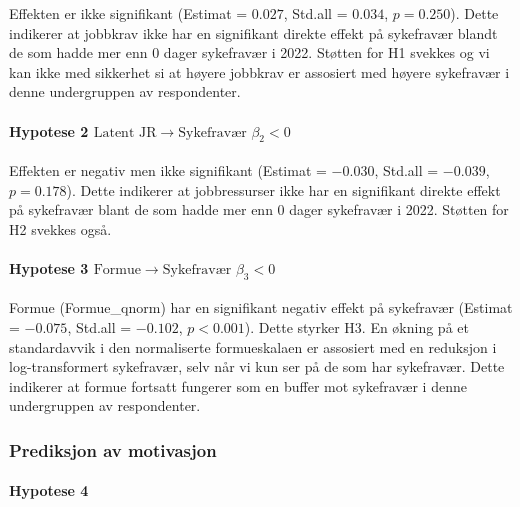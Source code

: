 \documentclass[
  12pt,
  a4paper,
  DIV=11,
  numbers=noendperiod]{scrartcl}
\let\oldparagraph\paragraph
\renewcommand{\paragraph}[1]{\oldparagraph{#1}\mbox{}}
\begin{document}
Effekten er ikke signifikant (Estimat = \(0.027\), Std.all = \(0.034\),
\(p = 0.250\)). Dette indikerer at jobbkrav ikke har en signifikant
direkte effekt på sykefravær blandt de som hadde mer enn 0 dager
sykefravær i 2022. Støtten for H1 svekkes og vi kan ikke med sikkerhet
si at høyere jobbkrav er assosiert med høyere sykefravær i denne
undergruppen av respondenter.

\paragraph{\texorpdfstring{Hypotese 2
\(\text{Latent JR} \rightarrow \text{Sykefravær } \beta_2 < 0\)}{Hypotese 2 \textbackslash text\{Latent JR\} \textbackslash rightarrow \textbackslash text\{Sykefravær \} \textbackslash beta\_2 \textless{} 0}}\label{hypotese-2-textlatent-jr-rightarrow-textsykefravuxe6r-beta_2-0-1}

Effekten er negativ men ikke signifikant (Estimat = \(-0.030\), Std.all
= \(-0.039\), \(p = 0.178\)). Dette indikerer at jobbressurser ikke har
en signifikant direkte effekt på sykefravær blant de som hadde mer enn 0
dager sykefravær i 2022. Støtten for H2 svekkes også.

\paragraph{\texorpdfstring{Hypotese 3
\(\text{Formue} \rightarrow \text{Sykefravær } \beta_3 < 0\)}{Hypotese 3 \textbackslash text\{Formue\} \textbackslash rightarrow \textbackslash text\{Sykefravær \} \textbackslash beta\_3 \textless{} 0}}\label{hypotese-3-textformue-rightarrow-textsykefravuxe6r-beta_3-0-1}

Formue (Formue\_qnorm) har en signifikant negativ effekt på sykefravær
(Estimat = \(-0.075\), Std.all = \(-0.102\), \(p < 0.001\)). Dette
styrker H3. En økning på et standardavvik i den normaliserte
formueskalaen er assosiert med en reduksjon i log-transformert
sykefravær, selv når vi kun ser på de som har sykefravær. Dette
indikerer at formue fortsatt fungerer som en buffer mot sykefravær i
denne undergruppen av respondenter.

\subsubsection{Prediksjon av
motivasjon}\label{prediksjon-av-motivasjon-1}

\paragraph{Hypotese 4}\label{hypotese-4-1}
\end{document}
